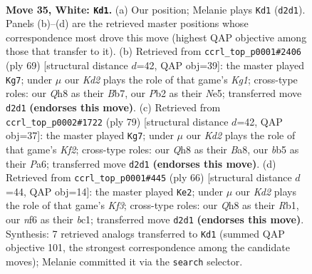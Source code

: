 \documentclass[11pt]{article}
\begin{document}
\clearpage

\begin{figure}[p]\centering
\begin{subfigure}{0.46\textwidth}\centering
\resizebox{\linewidth}{!}{%
\newchessgame
\chessboard[
  setfen={7Q/5k2/r4n2/pb1Pp3/8/6p1/PPPK2P1/2R5 w - - 6 35},
  showmover=false,
  pgfstyle=straightmove, color=movearrow, markmove={d2-d1}
]}
\caption{}
\end{subfigure}\hfill
\begin{subfigure}{0.46\textwidth}\centering
\resizebox{\linewidth}{!}{%
\newchessgame
\chessboard[
  setfen={5rk1/pb3p2/8/3NnP2/1p5P/8/P1P1B3/2KR4 b - - 2 35},
  showmover=false,
  pgfstyle=straightmove, color=movearrow, markmove={g8-g7}
]}
\caption{}
\end{subfigure}
\\[4pt]
\begin{subfigure}{0.46\textwidth}\centering
\resizebox{\linewidth}{!}{%
\newchessgame
\chessboard[
  setfen={b3r3/p4k1p/p1N3p1/8/3p4/1P1K4/P1R3PP/8 b - - 1 40},
  showmover=false,
  pgfstyle=straightmove, color=movearrow, markmove={f7-g7}
]}
\caption{}
\end{subfigure}\hfill
\begin{subfigure}{0.46\textwidth}\centering
\resizebox{\linewidth}{!}{%
\newchessgame
\chessboard[
  setfen={8/2r2p2/1p5p/4k3/1p5P/3B1K2/PP3P2/1Rb5 w - - 1 34},
  showmover=false,
  pgfstyle=straightmove, color=movearrow, markmove={f3-e2}
]}
\caption{}
\end{subfigure}
\caption{\textbf{Move 35, White: \texttt{Kd1}.} (a) Our position; Melanie plays \texttt{Kd1} (\texttt{d2d1}). Panels (b)--(d) are the retrieved master positions whose correspondence most drove this move (highest QAP objective among those that transfer to it). (b) Retrieved from \texttt{ccrl\_top\_p0001\#2406} (ply 69) [structural distance $d$=42, QAP obj=39]: the master played \texttt{Kg7}; under $\mu$ our \emph{Kd2} plays the role of that game's \emph{Kg1}; cross-type roles: our \emph{Q}h8 as their \emph{B}b7, our \emph{P}b2 as their \emph{N}e5; transferred move \texttt{d2d1} \textbf{(endorses this move)}. (c) Retrieved from \texttt{ccrl\_top\_p0002\#1722} (ply 79) [structural distance $d$=42, QAP obj=37]: the master played \texttt{Kg7}; under $\mu$ our \emph{Kd2} plays the role of that game's \emph{Kf2}; cross-type roles: our \emph{Q}h8 as their \emph{B}a8, our \emph{b}b5 as their \emph{P}a6; transferred move \texttt{d2d1} \textbf{(endorses this move)}. (d) Retrieved from \texttt{ccrl\_top\_p0001\#445} (ply 66) [structural distance $d$=44, QAP obj=14]: the master played \texttt{Ke2}; under $\mu$ our \emph{Kd2} plays the role of that game's \emph{Kf3}; cross-type roles: our \emph{Q}h8 as their \emph{R}b1, our \emph{n}f6 as their \emph{b}c1; transferred move \texttt{d2d1} \textbf{(endorses this move)}. Synthesis: 7 retrieved analogs transferred to \texttt{Kd1} (summed QAP objective 101, the strongest correspondence among the candidate moves); Melanie committed it via the \texttt{search} selector.}
\label{fig:thought-m68}
\end{figure}
\end{document}
